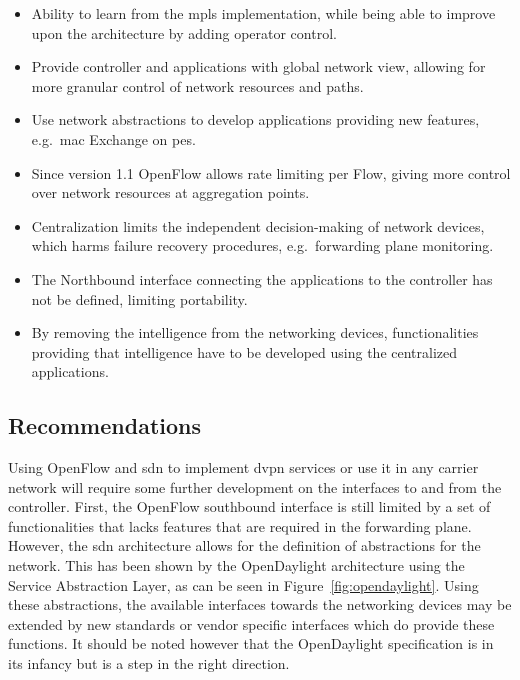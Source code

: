 \begin{minipage}[t]{0.5\textwidth}
\begin{itemize}[label=\checkmark]
	\item Ability to learn from the \ac{mpls} implementation, while being able to improve upon the architecture \cite{ss} by adding operator control.
	\item Provide controller and applications with global network view, allowing for more granular control of network resources and paths.
	\item Use network abstractions to develop applications providing new features, e.g.\ \ac{mac} Exchange on \acp{pe}.
	\item Since version 1.1 OpenFlow allows rate limiting per Flow, giving more control over network resources at aggregation points.
\end{itemize}
\end{minipage}%
\begin{minipage}[t]{0.5\textwidth}
\begin{itemize}[label=$\times$]
	\item Centralization limits the independent decision-making of network devices, which harms failure recovery procedures, e.g.\ forwarding plane monitoring.
	\item The Northbound interface connecting the applications to the controller has not be defined, limiting portability.
	\item By removing the intelligence from the networking devices, functionalities providing that intelligence have to be developed using the centralized applications.
\end{itemize}
\end{minipage}

\vspace{5 mm}


\subsection{Recommendations} %
\label{sub:recommendations}

Using OpenFlow and \ac{sdn} to implement \ac{dvpn} services or use it in any carrier network will require some further development on the interfaces to and from the controller. First, the OpenFlow southbound interface is still limited by a set of functionalities that lacks features that are required in the forwarding plane. However, the \ac{sdn} architecture allows for the definition of abstractions for the network. This has been shown by the OpenDaylight architecture using the Service Abstraction Layer, as can be seen in Figure~\ref{fig:opendaylight}. Using these abstractions, the available interfaces towards the networking devices may be extended by new standards or vendor specific interfaces which do provide these functions. It should be noted however that the OpenDaylight specification is in its infancy but is a step in the right direction.

